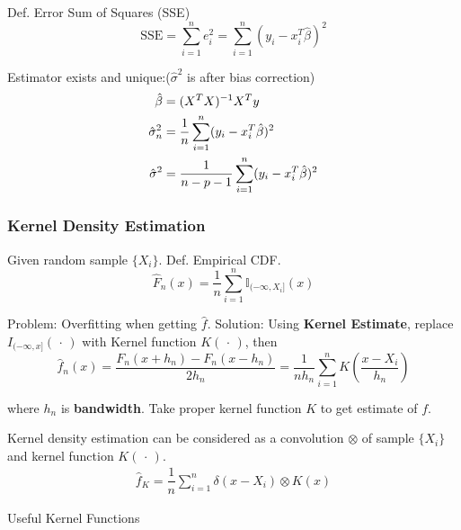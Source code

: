     Def. Error Sum of Squares (SSE)
    \begin{equation}\mathrm{SSE}=\sum_{i=1}^ne_i^2=\sum_{i=1}^n(y_i-x_i^T\hat{\beta })^2\end{equation}

    Estimator exists and unique:($\hat{\sigma}^2$ is after bias correction)
    \begin{align}
        \hat{\beta}&=(X^TX)^{-1}X^Ty\notag \\
        \hat{\sigma}_n^2&=\frac{1}{n}\sum_{i=1}^n(y_i-x^T_i\hat{\beta})^2 \notag\\ 
        \hat{\sigma}^2&=\frac{1}{n-p-1}\sum_{i=1}^n(y_i-x_i^T\hat{\beta})^2\label{EqaEstimatorSigmaWithDoF}
    \end{align}

    

\subsubsection{Kernel Density Estimation}\label{SubSectionKernelDensityEstimation}
    Given random sample $\{X_i\}$. Def. Empirical CDF.
    \begin{equation}\label{empiricaldisreibutionfunction}
        \hat{F}_n(x)=\frac{1}{n}\sum_{i=1}^n\mathbb{I}_{(-\infty,X_i]}(x) 
    \end{equation}
        

    Problem: Overfitting when getting $\hat{f}$. Solution: Using \textbf{Kernel Estimate}, replace $I_{(-\infty,x]}(\,\cdot\,)$ with Kernel function $K(\,\cdot\,)$, then
    \begin{equation}
        \hat{f}_n(x)=\dfrac{F_n(x+h_n)-F_n(x-h_n)}{2h_n}=\frac{1}{nh_n}\sum_{i=1}^nK(\frac{x-X_i}{h_n})
    \end{equation}

    where $h_n$ is \textbf{bandwidth}. Take proper kernel function $K$ to get estimate of $f$.

    Kernel density estimation can be considered as a convolution $ \otimes $ of sample $\{X_i\}$ and kernel function $K(\, \cdot \, )$.
    \begin{align*}
        \hat{f}_K= \dfrac{1}{n}\sum_{i=1}^n\delta (x-X_i) \otimes K(x)
    \end{align*}
    
    

\begin{point}
        Useful Kernel Functions
\end{point}

